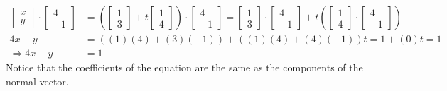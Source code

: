 \begin{align*}
\begin{bmatrix}
x\\
y
\end{bmatrix}
\cdot
\begin{bmatrix}
4\\
-1
\end{bmatrix}
&=
\left(\begin{bmatrix}
1\\
3
\end{bmatrix}
+ t
\begin{bmatrix}
1 \\
4
\end{bmatrix}\right)
\cdot
\begin{bmatrix}
4\\
-1
\end{bmatrix}
=
\begin{bmatrix}
1\\
3
\end{bmatrix}
\cdot
\begin{bmatrix}
4\\
-1
\end{bmatrix}
+ t
\left(\begin{bmatrix}
1 \\
4
\end{bmatrix} 
\cdot
\begin{bmatrix}
4\\
-1
\end{bmatrix}\right)\\
4x - y &= ((1)(4) + (3)(-1)) + ((1)(4)+(4)(-1))t = 1 + (0)t = 1 \\
\Rightarrow 4x - y &= 1
\end{align*}
Notice that the coefficients of the equation are the same as the components of the normal vector.

